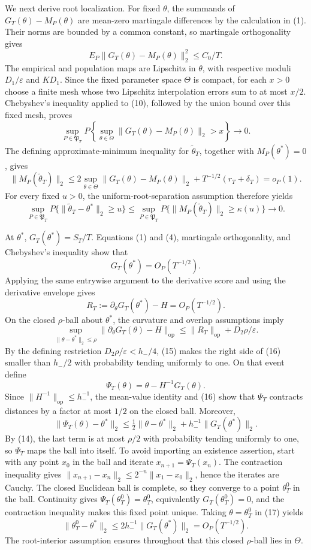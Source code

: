 We next derive root localization. For fixed \(\theta\), the summands of \(G_T(\theta)-M_P(\theta)\) are mean-zero martingale differences by the calculation in (1). Their norms are bounded by a common constant, so martingale orthogonality gives
\[
 E_P\|G_T(\theta)-M_P(\theta)\|_2^2\le C_0/T. \tag{10}
\]
The empirical and population maps are Lipschitz in \(\theta\), with respective moduli \(D_1/\varepsilon\) and \(KD_1\). Since the fixed parameter space \(\Theta\) is compact, for each \(x>0\) choose a finite mesh whose two Lipschitz interpolation errors sum to at most \(x/2\). Chebyshev's inequality applied to (10), followed by the union bound over this fixed mesh, proves
\[
 \sup_{P\in\mathfrak P_T}P\left\{
 \sup_{\theta\in\Theta}\|G_T(\theta)-M_P(\theta)\|_2>x\right\}
 \longrightarrow0. \tag{11}
\]
The defining approximate-minimum inequality for \(\widetilde\theta_T\), together with \(M_P(\theta^*)=0\), gives
\[
 \|M_P(\widetilde\theta_T)\|_2
 \le 2\sup_{\theta\in\Theta}\|G_T(\theta)-M_P(\theta)\|_2
 +T^{-1/2}(r_T+\delta_T)=o_P(1). \tag{12}
\]
For every fixed \(u>0\), the uniform-root-separation assumption therefore yields
\[
 \sup_{P\in\mathfrak P_T}P\{\|\widetilde\theta_T-\theta^*\|_2\ge u\}
 \le \sup_{P\in\mathfrak P_T}P\{\|M_P(\widetilde\theta_T)\|_2\ge\kappa(u)\}
 \longrightarrow0. \tag{13}
\]

At \(\theta^*\), \(G_T(\theta^*)=S_T/T\). Equations (1) and (4), martingale orthogonality, and Chebyshev's inequality show that
\[
 G_T(\theta^*)=O_P(T^{-1/2}). \tag{14}
\]
Applying the same entrywise argument to the derivative score and using the derivative envelope gives
\[
 R_T:=\partial_\theta G_T(\theta^*)-H=O_P(T^{-1/2}). \tag{15}
\]
On the closed \(\rho\)-ball about \(\theta^*\), the curvature and overlap assumptions imply
\[
 \sup_{\|\theta-\theta^*\|_2\le\rho}
 \|\partial_\theta G_T(\theta)-H\|_{\mathrm{op}}
 \le \|R_T\|_{\mathrm{op}}+D_2\rho/\varepsilon. \tag{16}
\]
By the defining restriction \(D_2\rho/\varepsilon<h_-/4\), (15) makes the right side of (16) smaller than \(h_-/2\) with probability tending uniformly to one. On that event define
\[
 \Psi_T(\theta)=\theta-H^{-1}G_T(\theta).
\]
Since \(\|H^{-1}\|_{\mathrm{op}}\le h_-^{-1}\), the mean-value identity and (16) show that \(\Psi_T\) contracts distances by a factor at most \(1/2\) on the closed ball. Moreover,
\[
 \|\Psi_T(\theta)-\theta^*\|_2
 \le \tfrac12\|\theta-\theta^*\|_2
 +h_-^{-1}\|G_T(\theta^*)\|_2. \tag{17}
\]
By (14), the last term is at most \(\rho/2\) with probability tending uniformly to one, so \(\Psi_T\) maps the ball into itself. To avoid importing an existence assertion, start with any point \(x_0\) in the ball and iterate \(x_{n+1}=\Psi_T(x_n)\). The contraction inequality gives \(\|x_{n+1}-x_n\|_2\le2^{-n}\|x_1-x_0\|_2\), hence the iterates are Cauchy. The closed Euclidean ball is complete, so they converge to a point \(\theta_T^0\) in the ball. Continuity gives \(\Psi_T(\theta_T^0)=\theta_T^0\), equivalently \(G_T(\theta_T^0)=0\), and the contraction inequality makes this fixed point unique. Taking \(\theta=\theta_T^0\) in (17) yields
\[
 \|\theta_T^0-\theta^*\|_2
 \le2h_-^{-1}\|G_T(\theta^*)\|_2=O_P(T^{-1/2}). \tag{18}
\]
The root-interior assumption ensures throughout that this closed \(\rho\)-ball lies in \(\Theta\).


